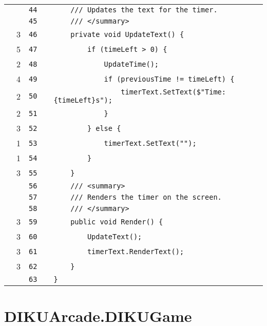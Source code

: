\documentclass[a4paper,landscape,10pt]{article}
\begin{document}
\begin{longtable}[l]{lrrll}
\cellcolor{gray} &  & \verb~44~ & & \verb~    /// Updates the text for the timer.~\\
\cellcolor{gray} &  & \verb~45~ & & \verb~    /// </summary>~\\
\cellcolor{green} & 3 & \verb~46~ & & \verb~    private void UpdateText() {~\\
\cellcolor{green} & 5 & \verb~47~ & & \verb~        if (timeLeft > 0) {~\\
\cellcolor{green} & 2 & \verb~48~ & & \verb~            UpdateTime();~\\
\cellcolor{green} & 4 & \verb~49~ & & \verb~            if (previousTime != timeLeft) {~\\
\cellcolor{green} & 2 & \verb~50~ & & \verb~                timerText.SetText($"Time: {timeLeft}s");~\\
\cellcolor{green} & 2 & \verb~51~ & & \verb~            }~\\
\cellcolor{green} & 3 & \verb~52~ & & \verb~        } else {~\\
\cellcolor{green} & 1 & \verb~53~ & & \verb~            timerText.SetText("");~\\
\cellcolor{green} & 1 & \verb~54~ & & \verb~        }~\\
\cellcolor{green} & 3 & \verb~55~ & & \verb~    }~\\
\cellcolor{gray} &  & \verb~56~ & & \verb~    /// <summary>~\\
\cellcolor{gray} &  & \verb~57~ & & \verb~    /// Renders the timer on the screen.~\\
\cellcolor{gray} &  & \verb~58~ & & \verb~    /// </summary>~\\
\cellcolor{green} & 3 & \verb~59~ & & \verb~    public void Render() {~\\
\cellcolor{green} & 3 & \verb~60~ & & \verb~        UpdateText();~\\
\cellcolor{green} & 3 & \verb~61~ & & \verb~        timerText.RenderText();~\\
\cellcolor{green} & 3 & \verb~62~ & & \verb~    }~\\
\cellcolor{gray} &  & \verb~63~ & & \verb~}~\\
\end{longtable}
\newpage
\section{DIKUArcade.DIKUGame}
\end{document}
